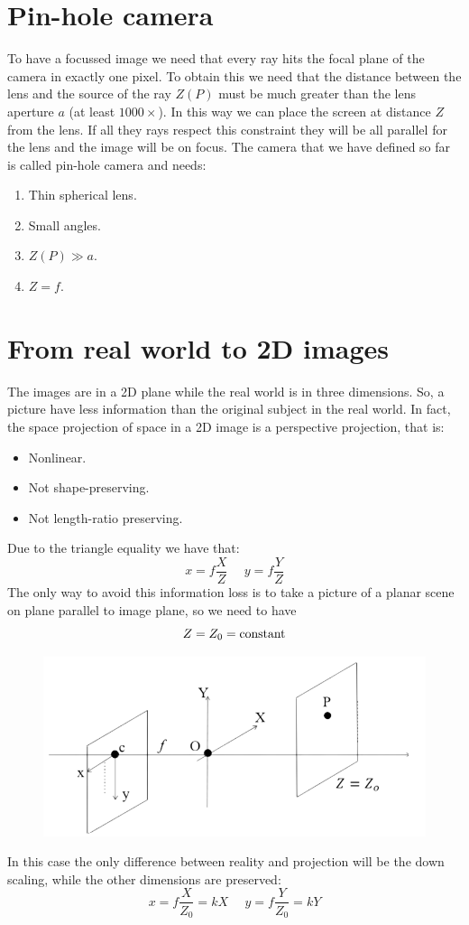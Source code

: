 \documentclass[12pt, a4paper]{report}
\begin{document}
    \section{Pin-hole camera}
    To have a focussed image we need that every ray hits the focal plane of the camera in exactly one pixel. To obtain this we need that the distance between the lens and
    the source of the ray $Z(P)$ must be much greater than the lens aperture $a$ (at least $1000\times$). In this way we can place the screen at distance $Z$ from the lens. If all they rays
    respect this constraint they will be all parallel for the lens and the image will be on focus. The camera that we have defined so far is called pin-hole camera and needs:
    \begin{enumerate}
        \item Thin spherical lens. 
        \item Small angles.
        \item $Z(P) \gg a$.
        \item $Z=f$.
    \end{enumerate}

    \section{From real world to 2D images}
    The images are in a 2D plane while the real world is in three dimensions. So, a picture have less information than the original subject in the real world. In fact, the space 
    projection of space in a 2D image is a perspective projection, that is: 
    \begin{itemize}
        \item Nonlinear.
        \item Not shape-preserving.
        \item Not length-ratio preserving. 
    \end{itemize}
    Due to the triangle equality we have that:
    \[x=f \dfrac{X}{Z} \:\:\:\:\:\: y=f \dfrac{Y}{Z}\]
    The only way to avoid this information loss is to take a picture of a planar scene on plane parallel to image plane, so we need to have 
    \[Z=Z_0=\textnormal{constant}\]
    \begin{figure}[H]
        \centering
        \includegraphics[width=0.5\linewidth]{images/Z0.png}
    \end{figure}
    In this case the only difference between reality and projection will be the down scaling, while the other dimensions are preserved: 
    \[x=f \dfrac{X}{Z_0}=kX \:\:\:\:\:\: y=f \dfrac{Y}{Z_0}=kY \]
    
\end{document}
